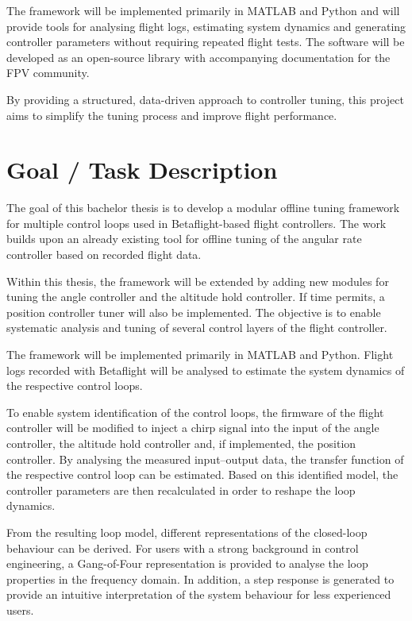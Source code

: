 \documentclass[a4paper,11pt,bibliography=totoc,listof=totoc]{scrreprt}
\begin{document}
The framework will be implemented primarily in MATLAB and Python and will provide 
tools for analysing flight logs, estimating system dynamics and generating 
controller parameters without requiring repeated flight tests. The software will 
be developed as an open-source library with accompanying documentation for the 
FPV community.

By providing a structured, data-driven approach to controller tuning, this 
project aims to simplify the tuning process and improve flight performance.

\newpage

\section{Goal / Task Description}


The goal of this bachelor thesis is to develop a modular offline tuning 
framework for multiple control loops used in Betaflight-based flight 
controllers. The work builds upon an already existing tool for offline 
tuning of the angular rate controller based on recorded flight data.

Within this thesis, the framework will be extended by adding new modules 
for tuning the angle controller and the altitude hold controller. If time 
permits, a position controller tuner will also be implemented. The objective 
is to enable systematic analysis and tuning of several control layers of 
the flight controller.

The framework will be implemented primarily in MATLAB and Python. Flight 
logs recorded with Betaflight will be analysed to estimate the system 
dynamics of the respective control loops.

To enable system identification of the control loops, the firmware of the 
flight controller will be modified to inject a chirp signal into the input 
of the angle controller, the altitude hold controller and, if implemented, 
the position controller. By analysing the measured input–output data, the 
transfer function of the respective control loop can be estimated. Based on 
this identified model, the controller parameters are then recalculated in 
order to reshape the loop dynamics.

From the resulting loop model, different representations of the closed-loop 
behaviour can be derived. For users with a strong background in control 
engineering, a Gang-of-Four representation is provided to analyse the loop 
properties in the frequency domain. In addition, a step response is generated 
to provide an intuitive interpretation of the system behaviour for less 
experienced users.
\end{document}
